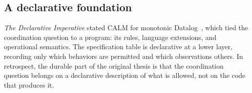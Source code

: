 \subsection{A declarative foundation}

\emph{The Declarative Imperative} stated CALM for monotonic
Datalog~\cite{hellerstein2010declarative}, which tied the coordination
question to a program: its rules, language extensions, and operational
semantics. The specification table is declarative at a lower layer, recording
only which behaviors are permitted and which observations \outrelbase others.
In retrospect, the durable part of the original thesis is that the
coordination question belongs on a declarative description of what is
allowed, not on the code that produces it.
